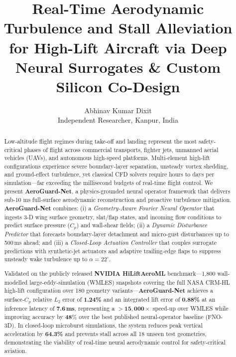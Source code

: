 \documentclass[10pt,twocolumn,letterpaper]{article}
\title{Real-Time Aerodynamic Turbulence and Stall Alleviation\\
for High-Lift Aircraft via Deep Neural Surrogates \& Custom Silicon Co-Design}
\author{Abhinav Kumar Dixit\\
Independent Researcher, Kanpur, India
}
\newcommand{\aeroguard}{\textbf{AeroGuard-Net}}
\newcommand{\Cp}{C_p}
\begin{document}
\maketitle

\begin{abstract}
Low-altitude flight regimes during take-off and landing represent the
most safety-critical phases of flight across commercial transports,
fighter jets, unmanned aerial vehicles (UAVs), and autonomous
high-speed platforms. Multi-element high-lift configurations experience
severe boundary-layer separation, unsteady vortex shedding, and
ground-effect turbulence, yet classical CFD solvers require hours to
days per simulation—far exceeding the millisecond budgets of real-time
flight control. We present \aeroguard{}, a physics-grounded neural
operator framework that delivers sub-10 ms full-surface aerodynamic
reconstruction and proactive turbulence mitigation. \aeroguard{}
combines: (i) a \emph{Geometry-Aware Fourier Neural Operator} that
ingests 3-D wing surface geometry, slat/flap states, and incoming flow
conditions to predict surface pressure ($\Cp$) and wall-shear fields;
(ii) a \emph{Dynamic Disturbance Predictor} that forecasts boundary-layer
detachment and micro-gust disturbances up to 500\,ms ahead; and
(iii) a \emph{Closed-Loop Actuation Controller} that couples surrogate
predictions with synthetic-jet actuators and adaptive trailing-edge
flaps to suppress unsteady wake turbulence up to $\alpha=22^\circ$.

Validated on the publicly released \textbf{NVIDIA HiLiftAeroML}
benchmark—1,800 wall-modelled large-eddy-simulation (WMLES) snapshots
covering the full NASA CRM-HL high-lift configuration over 180 geometry
variants—\aeroguard{} achieves a surface-$\Cp$ relative $L_2$ error
of \textbf{1.24\%} and an integrated lift error of \textbf{0.88\%} at
an inference latency of \textbf{7.6\,ms}, representing a
$\mathbf{>15{,}000\times}$ speed-up over WMLES while improving
accuracy by $\mathbf{48\%}$ over the best published neural-operator
baseline (FNO-3D). In closed-loop microburst simulations, the system
reduces peak vertical acceleration by \textbf{64.3\%} and prevents
stall across all 18 unseen test geometries, demonstrating the viability
of real-time neural aerodynamic control for safety-critical aviation.
\end{abstract}

\end{document}
